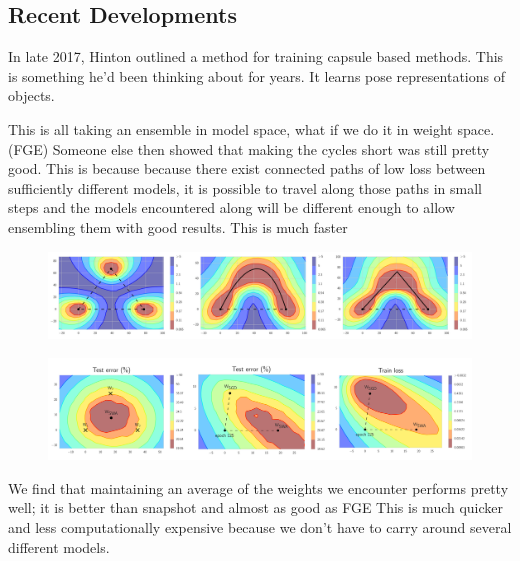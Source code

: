 \subsection{Recent Developments}\label{subsec:recent_improvements}
In late 2017, Hinton outlined a method for training capsule based methods.
This is something he'd been thinking about for years.
It learns pose representations of objects. \cite{Hinton_Sabour_Frosst_2018, Sabour_Frosst_Hinton_2017}



This is all taking an ensemble in model space, what if we do it in weight space.
(FGE) Someone else then showed that making the cycles short was still pretty good.
This is because because there exist connected paths of low loss between sufficiently different models, it is possible to travel along those paths in small steps and the models encountered along will be different enough to allow ensembling them with good results.
This is much faster
\cite{Garipov_Izmailov_Podoprikhin_Vetrov_Wilson_2018}



\begin{figure}
    \centering
    \includegraphics[width=\textwidth]{./img/FGE.png}
    \caption{}
    \label{fig:FGE_shortest_path}
\end{figure}

\begin{figure}
    \centering
    \includegraphics[width=\textwidth]{./img/SWA.png}
    \caption{\cite{Izmailov_Podoprikhin_Garipov_Vetrov_Wilson_2018}}
    \label{fig:SWA}
\end{figure}


We find that maintaining an average of the weights we encounter performs pretty well; it is better than snapshot and almost as good as FGE
This is much quicker and less computationally expensive because we don't have to carry around several different models. \cite{Izmailov_Podoprikhin_Garipov_Vetrov_Wilson_2018}

